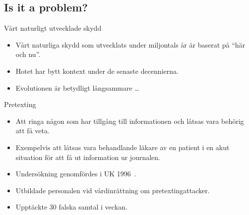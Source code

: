 \documentclass{beamer}
\begin{document}
\subsection{Is it a problem?}

\begin{frame}{Vårt naturligt utvecklade skydd}
  \begin{itemize}
    \item Vårt naturliga skydd som utvecklats under miljontals år är baserat på 
      \enquote{här och nu}.

    \item Hotet har bytt kontext under de senaste decennierna.

    \item Evolutionen är betydligt långsammare \dots

  \end{itemize}
\end{frame}

\begin{frame}
  \begin{block}{Pretexting}
    \begin{itemize}
      \item Att ringa någon som har tillgång till informationen och låtsas vara 
        behörig att få veta.

      \item Exempelvis att låtsas vara behandlande läkare av en patient i en akut 
        situation för att få ut information ur journalen.
    \end{itemize}
  \end{block}
\end{frame}

\begin{frame}
  \begin{example}
    \begin{itemize}
      \item Undersökning genomfördes i UK 1996~\cite{Anderson2008sea}.
      \item Utbildade personalen vid vårdinrättning om pretextingattacker.
      \item Upptäckte 30 falska samtal i veckan.
    \end{itemize}
  \end{example}
\end{frame}
\end{document}

